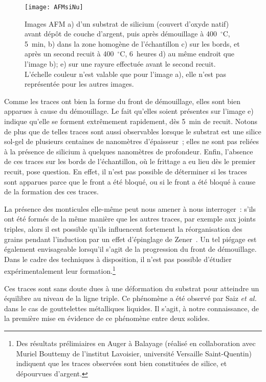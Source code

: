 \begin{figure}[h]
	\centering
	\texttt{[image: AFMsiNu]}
	\caption{Images AFM a) d'un substrat de silicium (couvert d'oxyde natif) avant dépôt de couche d'argent, puis après démouillage à 400~$^\circ$C, 5~min, b) dans la zone homogène de l'échantillon c) sur les bords, et après un second recuit à 400~$^\circ$C, 6~heures d) au même endroit que l'image b); e) sur une rayure effectuée avant le second recuit. L'échelle couleur n'est valable que pour l'image a), elle n'est pas représentée pour les autres images.}
	\label{AFMsiNu}
\end{figure}

Comme les traces ont bien la forme du front de démouillage, elles sont bien apparues à cause du démouillage. Le fait qu'elles soient présentes sur l'image e) indique qu'elle se forment extrêmement rapidement, dès 5~min de recuit. Notons de plus que de telles traces sont aussi observables lorsque le substrat est une silice sol-gel de plusieurs centaines de nanomètres d'épaisseur~; elles ne sont pas reliées à la présence de silicium à quelques nanomètres de profondeur. Enfin, l'absence de ces traces sur les bords de l'échantillon, où le frittage a eu lieu dès le premier recuit, pose question. En effet, il n'est pas possible de déterminer si les traces sont apparues parce que le front a été bloqué, ou si le front a été bloqué à cause de la formation des ces traces.\par
La présence des monticules elle-même peut nous amener à nous interroger~: s'ils ont été formés de la même manière que les autres traces, par exemple aux joints triples, alors il est possible qu'ils influencent fortement la réorganisation des grains pendant l'induction par un effet d'épinglage de Zener~\cite{weygand1999zener}. Un tel piégage est également envisageable lorsqu'il s'agit de la progression du front de démouillage. Dans le cadre des techniques à disposition, il n'est pas possible d'étudier expérimentalement leur formation.\footnote{Des résultats prélimiaires en Auger à Balayage (réalisé en collaboration avec Muriel Bouttemy de l'institut Lavoisier, université Versaille Saint-Quentin) indiquent que les traces observées sont bien constituées de silice, et dépourvues d'argent.}\par
Ces traces sont sans doute dues à une déformation du substrat pour atteindre un équilibre au niveau de la ligne triple. Ce phénomène a été observé par Saiz \textit{et al.}~\cite{saiz04} dans le cas de gouttelettes métalliques liquides. Il s'agit, à notre connaissance, de la première mise en évidence de ce phénomène entre deux solides.\par  

